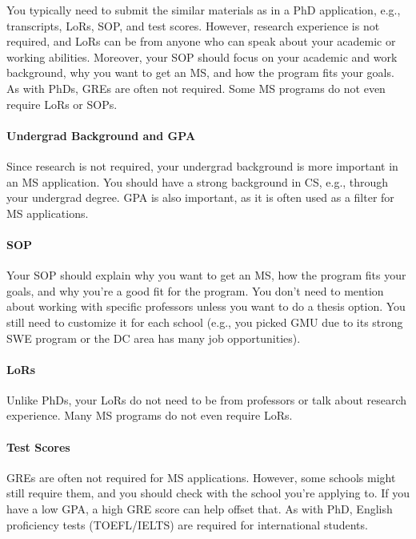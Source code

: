 \documentclass[oneside,11pt,dvipsnames]{book}
\begin{document}
You typically need to submit the similar materials as in a PhD application, e.g., transcripts, LoRs, SOP, and test scores.  However, research experience is not required, and LoRs can be from anyone who can speak about your academic or working abilities. Moreover, your SOP should focus on your academic and work background, why you want to get an MS, and how the program fits your goals. As with PhDs, GREs are often not required. Some MS programs do not even require LoRs or SOPs.  

\paragraph{Undergrad Background and GPA} Since research is not required, your undergrad background is more important in an MS application.  You should have a strong background in CS, e.g., through your undergrad degree.  GPA is also important, as it is often used as a filter for MS applications.

\paragraph{SOP} Your SOP should explain why you want to get an MS, how the program fits your goals, and why you're a good fit for the program.  You don't need to mention about working with specific professors unless you want to do a thesis option. You still need to customize it for each school (e.g., you picked GMU due to its strong SWE program or the DC area has many job opportunities).

\paragraph{LoRs} Unlike PhDs, your LoRs do not need to be from professors or talk about research experience. Many MS programs do not even require LoRs.

\paragraph{Test Scores} GREs are often not required for MS applications.  However, some schools might still require them, and you should check with the school you're applying to.  If you have a low GPA, a high GRE score can help offset that. As with PhD, English proficiency tests (TOEFL/IELTS) are required for international students.
\end{document}

